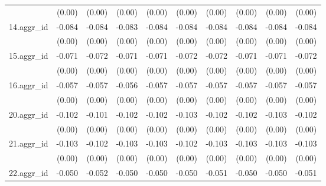 {\begin{tabular}{l*{9}{c}}
          &   (0.00)         &   (0.00)         &   (0.00)         &   (0.00)         &   (0.00)         &   (0.00)         &   (0.00)         &   (0.00)         &   (0.00)         \\
[1em]
14.aggr\_id&   -0.084\sym{***}&   -0.084\sym{***}&   -0.083\sym{***}&   -0.084\sym{***}&   -0.084\sym{***}&   -0.084\sym{***}&   -0.084\sym{***}&   -0.084\sym{***}&   -0.084\sym{***}\\
          &   (0.00)         &   (0.00)         &   (0.00)         &   (0.00)         &   (0.00)         &   (0.00)         &   (0.00)         &   (0.00)         &   (0.00)         \\
[1em]
15.aggr\_id&   -0.071\sym{***}&   -0.072\sym{***}&   -0.071\sym{***}&   -0.071\sym{***}&   -0.072\sym{***}&   -0.072\sym{***}&   -0.071\sym{***}&   -0.071\sym{***}&   -0.072\sym{***}\\
          &   (0.00)         &   (0.00)         &   (0.00)         &   (0.00)         &   (0.00)         &   (0.00)         &   (0.00)         &   (0.00)         &   (0.00)         \\
[1em]
16.aggr\_id&   -0.057\sym{***}&   -0.057\sym{***}&   -0.056\sym{***}&   -0.057\sym{***}&   -0.057\sym{***}&   -0.057\sym{***}&   -0.057\sym{***}&   -0.057\sym{***}&   -0.057\sym{***}\\
          &   (0.00)         &   (0.00)         &   (0.00)         &   (0.00)         &   (0.00)         &   (0.00)         &   (0.00)         &   (0.00)         &   (0.00)         \\
[1em]
20.aggr\_id&   -0.102\sym{***}&   -0.101\sym{***}&   -0.102\sym{***}&   -0.102\sym{***}&   -0.103\sym{***}&   -0.102\sym{***}&   -0.102\sym{***}&   -0.103\sym{***}&   -0.102\sym{***}\\
          &   (0.00)         &   (0.00)         &   (0.00)         &   (0.00)         &   (0.00)         &   (0.00)         &   (0.00)         &   (0.00)         &   (0.00)         \\
[1em]
21.aggr\_id&   -0.103\sym{***}&   -0.102\sym{***}&   -0.103\sym{***}&   -0.103\sym{***}&   -0.102\sym{***}&   -0.103\sym{***}&   -0.103\sym{***}&   -0.103\sym{***}&   -0.103\sym{***}\\
          &   (0.00)         &   (0.00)         &   (0.00)         &   (0.00)         &   (0.00)         &   (0.00)         &   (0.00)         &   (0.00)         &   (0.00)         \\
[1em]
22.aggr\_id&   -0.050\sym{***}&   -0.052\sym{***}&   -0.050\sym{***}&   -0.050\sym{***}&   -0.050\sym{***}&   -0.051\sym{***}&   -0.050\sym{***}&   -0.050\sym{***}&   -0.051\sym{***}\\

\end{tabular}}
